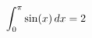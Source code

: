\documentclass[preview]{standalone}
\begin{document}
\begin{align*}
\special{dvisvgm:raw <g id='unique000'>}\int_0^\pi\sin(x)\,dx=2\special{dvisvgm:raw </g>}
\end{align*}
\end{document}
